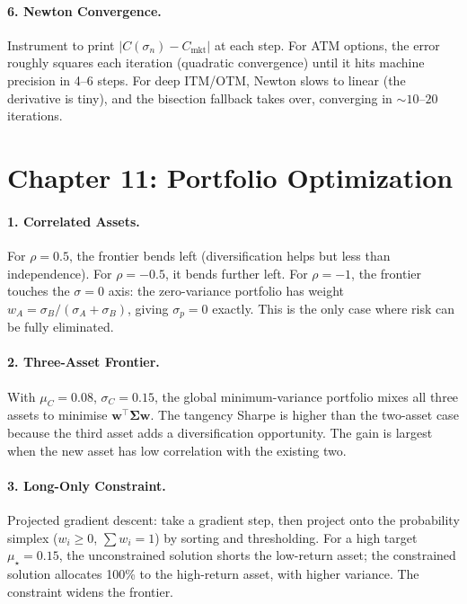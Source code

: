 \paragraph{6. Newton Convergence.}
Instrument  to print $|C(\sigma_n) -
C_{\text{mkt}}|$ at each step. For ATM options, the error roughly
squares each iteration (quadratic convergence) until it hits
machine precision in 4--6 steps. For deep ITM/OTM, Newton slows to
linear (the derivative is tiny), and the bisection fallback takes
over, converging in $\sim 10$--$20$ iterations.

\section*{Chapter 11: Portfolio Optimization}

\paragraph{1. Correlated Assets.}
For $\rho = 0.5$, the frontier bends left (diversification helps
but less than independence). For $\rho = -0.5$, it bends further
left. For $\rho = -1$, the frontier touches the $\sigma = 0$ axis:
the zero-variance portfolio has weight $w_A = \sigma_B / (\sigma_A +
\sigma_B)$, giving $\sigma_p = 0$ exactly. This is the only case
where risk can be fully eliminated.

\paragraph{2. Three-Asset Frontier.}
With $\mu_C = 0.08$, $\sigma_C = 0.15$, the global minimum-variance
portfolio mixes all three assets to minimise $\mathbf{w}^\top
\boldsymbol{\Sigma} \mathbf{w}$. The tangency Sharpe is higher than
the two-asset case because the third asset adds a diversification
opportunity. The gain is largest when the new asset has low
correlation with the existing two.

\paragraph{3. Long-Only Constraint.}
Projected gradient descent: take a gradient step, then project onto
the probability simplex ($w_i \ge 0$, $\sum w_i = 1$) by sorting and
thresholding. For a high target $\mu_\star = 0.15$, the unconstrained
solution shorts the low-return asset; the constrained solution
allocates 100\% to the high-return asset, with higher variance. The
constraint widens the frontier.

